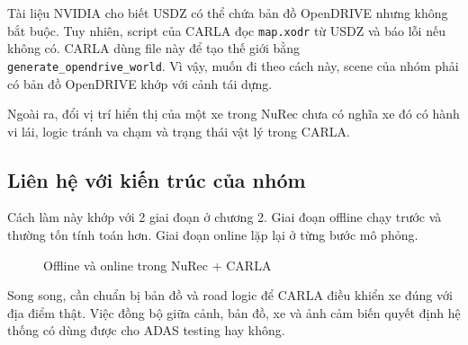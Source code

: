Tài liệu NVIDIA cho biết USDZ có thể chứa bản đồ OpenDRIVE nhưng không bắt buộc.
Tuy nhiên, script của CARLA đọc \texttt{map.xodr} từ USDZ và báo lỗi nếu không có.
CARLA dùng file này để tạo thế giới bằng \texttt{generate\_opendrive\_world}.
Vì vậy, muốn đi theo cách này, scene của nhóm phải có bản đồ OpenDRIVE khớp với cảnh tái dựng.

Ngoài ra, đổi vị trí hiển thị của một xe trong NuRec chưa có nghĩa xe đó có hành vi lái, logic tránh va chạm và trạng thái vật lý trong CARLA.

\subsection{Liên hệ với kiến trúc của nhóm}

Cách làm này khớp với 2 giai đoạn ở chương 2.
Giai đoạn offline chạy trước và thường tốn tính toán hơn. Giai đoạn online lặp lại ở từng bước mô phỏng.

\begin{figure}[H]
  \centering
  \caption{Offline và online trong NuRec + CARLA}
\end{figure}

Song song, cần chuẩn bị bản đồ và road logic để CARLA điều khiển xe đúng với địa điểm thật.
Việc đồng bộ giữa cảnh, bản đồ, xe và ảnh cảm biến quyết định hệ thống có dùng được cho ADAS testing hay không.

